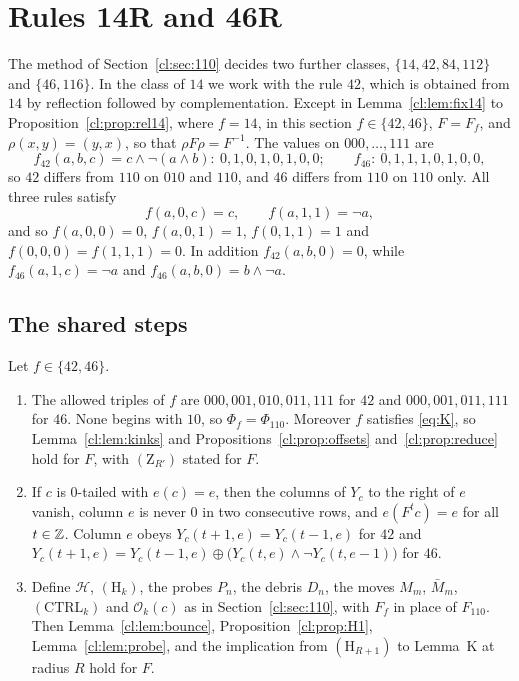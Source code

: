 \section{Rules 14R and 46R}\label{cl:sec:1446}

The method of Section~\ref{cl:sec:110} decides two further classes, $\{14,42,84,112\}$ and $\{46,116\}$. In the class of $14$ we work with the rule $42$, which is obtained from $14$ by reflection followed by complementation. Except in Lemma~\ref{cl:lem:fix14} to Proposition~\ref{cl:prop:rel14}, where $f=14$, in this section $f\in\{42,46\}$, $F=F_f$, and $\rho(x,y)=(y,x)$, so that $\rho F\rho=F^{-1}$. The values on $000,\dots,111$ are
\[
f_{42}(a,b,c)=c\wedge\neg(a\wedge b):\ 0,1,0,1,0,1,0,0;\qquad f_{46}:\ 0,1,1,1,0,1,0,0,
\]
so $42$ differs from $110$ on $010$ and $110$, and $46$ differs from $110$ on $110$ only. All three rules satisfy
\begin{equation}\label{cl:eq:K1}
f(a,0,c)=c,\qquad f(a,1,1)=\neg a,
\end{equation}
and so $f(a,0,0)=0$, $f(a,0,1)=1$, $f(0,1,1)=1$ and $f(0,0,0)=f(1,1,1)=0$. In addition $f_{42}(a,b,0)=0$, while $f_{46}(a,1,c)=\neg a$ and $f_{46}(a,b,0)=b\wedge\neg a$.

\subsection{The shared steps}\label{cl:sec:shared}

\begin{lemma}\label{cl:lem:shared}
Let $f\in\{42,46\}$.
\begin{enumerate}
\item The allowed triples of $f$ are $000,001,010,011,111$ for $42$ and $000,001,011,111$ for $46$. None begins with $10$, so $\Phi_f=\Phi_{110}$. Moreover $f$ satisfies \eqref{eq:K}, so Lemma~\ref{cl:lem:kinks} and Propositions~\ref{cl:prop:offsets} and~\ref{cl:prop:reduce} hold for $F$, with $(\mathrm Z_{R'})$ stated for $F$.
\item If $c$ is $0$-tailed with $e(c)=e$, then the columns of $Y_c$ to the right of $e$ vanish, column $e$ is never $0$ in two consecutive rows, and $e(F^tc)=e$ for all $t\in\mathbb{Z}$. Column $e$ obeys $Y_c(t+1,e)=Y_c(t-1,e)$ for $42$ and $Y_c(t+1,e)=Y_c(t-1,e)\oplus\bigl(Y_c(t,e)\wedge\neg Y_c(t,e-1)\bigr)$ for $46$.
\item Define $\mathcal H$, $(\mathrm H_k)$, the probes $P_n$, the debris $D_n$, the moves $M_m$, $\bar M_m$, $(\mathrm{CTRL}_k)$ and $\mathcal O_k(c)$ as in Section~\ref{cl:sec:110}, with $F_f$ in place of $F_{110}$. Then Lemma~\ref{cl:lem:bounce}, Proposition~\ref{cl:prop:H1}, Lemma~\ref{cl:lem:probe}, and the implication from $(\mathrm H_{R+1})$ to Lemma~K at radius $R$ hold for $F$.
\end{enumerate}
\end{lemma}

